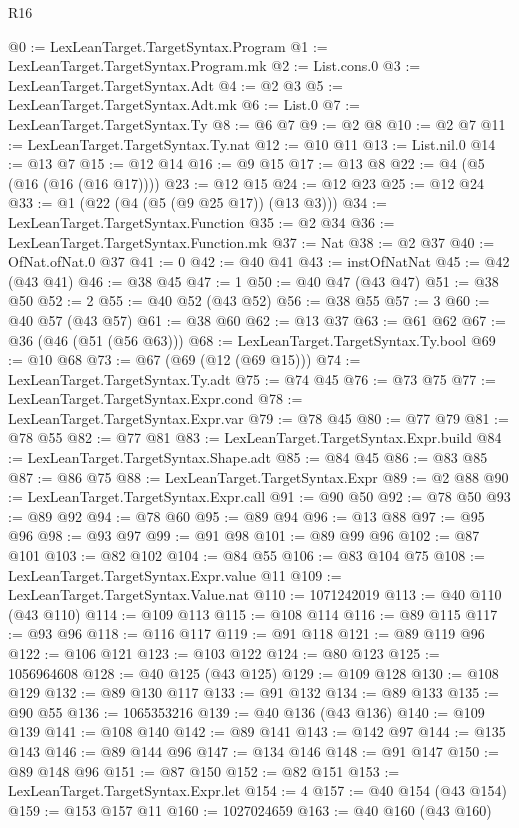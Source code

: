 \begin{lexlean}{R16}
\begin{coremodule}
@0 := LexLeanTarget.TargetSyntax.Program
@1 := LexLeanTarget.TargetSyntax.Program.mk
@2 := List.cons.{0}
@3 := LexLeanTarget.TargetSyntax.Adt
@4 := @2 @3
@5 := LexLeanTarget.TargetSyntax.Adt.mk
@6 := List.{0}
@7 := LexLeanTarget.TargetSyntax.Ty
@8 := @6 @7
@9 := @2 @8
@10 := @2 @7
@11 := LexLeanTarget.TargetSyntax.Ty.nat
@12 := @10 @11
@13 := List.nil.{0}
@14 := @13 @7
@15 := @12 @14
@16 := @9 @15
@17 := @13 @8
@22 := @4 (@5 (@16 (@16 (@16 @17))))
@23 := @12 @15
@24 := @12 @23
@25 := @12 @24
@33 := @1 (@22 (@4 (@5 (@9 @25 @17)) (@13 @3)))
@34 := LexLeanTarget.TargetSyntax.Function
@35 := @2 @34
@36 := LexLeanTarget.TargetSyntax.Function.mk
@37 := Nat
@38 := @2 @37
@40 := OfNat.ofNat.{0} @37
@41 := 0
@42 := @40 @41
@43 := instOfNatNat
@45 := @42 (@43 @41)
@46 := @38 @45
@47 := 1
@50 := @40 @47 (@43 @47)
@51 := @38 @50
@52 := 2
@55 := @40 @52 (@43 @52)
@56 := @38 @55
@57 := 3
@60 := @40 @57 (@43 @57)
@61 := @38 @60
@62 := @13 @37
@63 := @61 @62
@67 := @36 (@46 (@51 (@56 @63)))
@68 := LexLeanTarget.TargetSyntax.Ty.bool
@69 := @10 @68
@73 := @67 (@69 (@12 (@69 @15)))
@74 := LexLeanTarget.TargetSyntax.Ty.adt
@75 := @74 @45
@76 := @73 @75
@77 := LexLeanTarget.TargetSyntax.Expr.cond
@78 := LexLeanTarget.TargetSyntax.Expr.var
@79 := @78 @45
@80 := @77 @79
@81 := @78 @55
@82 := @77 @81
@83 := LexLeanTarget.TargetSyntax.Expr.build
@84 := LexLeanTarget.TargetSyntax.Shape.adt
@85 := @84 @45
@86 := @83 @85
@87 := @86 @75
@88 := LexLeanTarget.TargetSyntax.Expr
@89 := @2 @88
@90 := LexLeanTarget.TargetSyntax.Expr.call
@91 := @90 @50
@92 := @78 @50
@93 := @89 @92
@94 := @78 @60
@95 := @89 @94
@96 := @13 @88
@97 := @95 @96
@98 := @93 @97
@99 := @91 @98
@101 := @89 @99 @96
@102 := @87 @101
@103 := @82 @102
@104 := @84 @55
@106 := @83 @104 @75
@108 := LexLeanTarget.TargetSyntax.Expr.value @11
@109 := LexLeanTarget.TargetSyntax.Value.nat
@110 := 1071242019
@113 := @40 @110 (@43 @110)
@114 := @109 @113
@115 := @108 @114
@116 := @89 @115
@117 := @93 @96
@118 := @116 @117
@119 := @91 @118
@121 := @89 @119 @96
@122 := @106 @121
@123 := @103 @122
@124 := @80 @123
@125 := 1056964608
@128 := @40 @125 (@43 @125)
@129 := @109 @128
@130 := @108 @129
@132 := @89 @130 @117
@133 := @91 @132
@134 := @89 @133
@135 := @90 @55
@136 := 1065353216
@139 := @40 @136 (@43 @136)
@140 := @109 @139
@141 := @108 @140
@142 := @89 @141
@143 := @142 @97
@144 := @135 @143
@146 := @89 @144 @96
@147 := @134 @146
@148 := @91 @147
@150 := @89 @148 @96
@151 := @87 @150
@152 := @82 @151
@153 := LexLeanTarget.TargetSyntax.Expr.let
@154 := 4
@157 := @40 @154 (@43 @154)
@159 := @153 @157 @11
@160 := 1027024659
@163 := @40 @160 (@43 @160)

\end{coremodule}
\end{lexlean}

